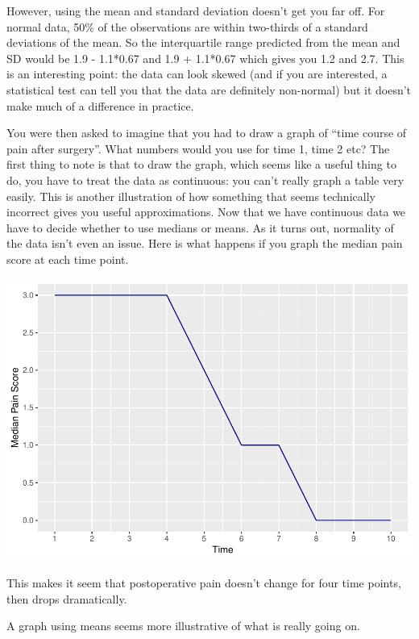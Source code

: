 \documentclass[]{book}
\begin{document}
However, using the mean and standard deviation doesn't get you far off.
For normal data, 50\% of the observations are within two-thirds of a
standard deviations of the mean. So the interquartile range predicted
from the mean and SD would be 1.9 - 1.1*0.67 and 1.9 + 1.1*0.67 which
gives you 1.2 and 2.7. This is an interesting point: the data can look
skewed (and if you are interested, a statistical test can tell you that
the data are definitely non-normal) but it doesn't make much of a
difference in practice.

You were then asked to imagine that you had to draw a graph of ``time
course of pain after surgery''. What numbers would you use for time 1,
time 2 etc? The first thing to note is that to draw the graph, which
seems like a useful thing to do, you have to treat the data as
continuous: you can't really graph a table very easily. This is another
illustration of how something that seems technically incorrect gives you
useful approximations. Now that we have continuous data we have to
decide whether to use medians or means. As it turns out, normality of
the data isn't even an issue. Here is what happens if you graph the
median pain score at each time point.

\includegraphics{09-answers_files/figure-latex/week2e-1.pdf}

This makes it seem that postoperative pain doesn't change for four time
points, then drops dramatically.

A graph using means seems more illustrative of what is really going on.
\end{document}
